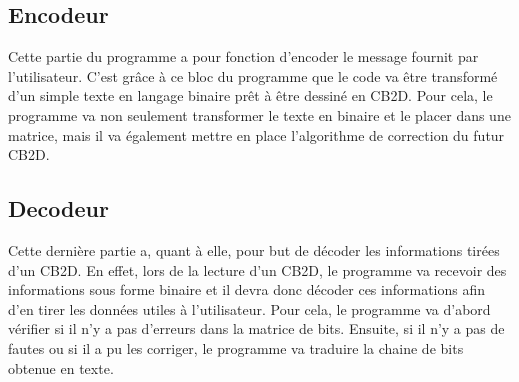 \subsection{Encodeur}

Cette partie du programme a pour fonction d'encoder le message fournit par l'utilisateur. C'est grâce à ce bloc du programme que le code va être transformé d'un simple texte en langage binaire prêt à être dessiné en CB2D. Pour cela, le programme va non seulement transformer le texte en binaire et le placer dans une matrice, mais il va également mettre en place l'algorithme de correction du futur CB2D. 
\subsection{Decodeur}

Cette dernière partie a, quant à elle, pour but de décoder les informations tirées d'un CB2D. 
En effet, lors de la lecture d'un CB2D, le programme va recevoir des informations sous forme binaire et il devra donc décoder ces informations afin d'en tirer les données utiles à l'utilisateur. Pour cela, le programme va d'abord vérifier si il n'y a pas d'erreurs dans la matrice de bits. Ensuite, si il n'y a pas de fautes ou si il a pu les corriger, le programme va traduire la chaine de bits obtenue en texte.
